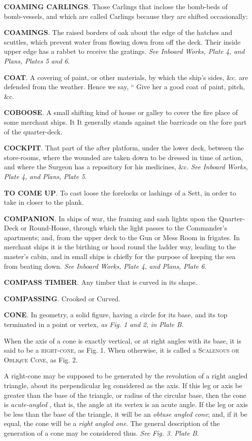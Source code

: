 \textbf{COAMING CARLINGS}. Those Carlings that inclose the bomb-beds of bomb-vessels, and which are called Carlings because they are shifted occasionally: 

\textbf{COAMINGS}. The raised borders of oak about the edge of the hatches and scuttles, which prevent water from flowing down from off the deck. Their inside upper edge has a rabbet to receive the gratings. \textit{See Inboard Works, Plate 4, and Plans, Plates 5 and 6}. 

\textbf{COAT}. A covering of paint, or other materials, by which the ship's sides, \&c. are defended from the weather. Hence we say, “ Give her a good coat of paint, pitch, \&c.

\textbf{COBOOSE}. A small shifting kind of house or galley to cover the fire place of some merchant ships. It It generally stands against the barricade on the fore part of the quarter-deck. 

\textbf{COCKPIT}. That part of the after platform, under the lower deck, between the store-rooms, where the wounded are taken down to be dressed in time of action, and where the Surgeon has a repository for his medicines, \&c. \textit{See Inboard Works, Plate 4, and Plans, Plate 5}. 

\textbf{TO COME UP}. To cast loose the forelocks or lashings of a Sett, in order to take in closer to the plank. 

\textbf{COMPANION}. In ships of war, the framing and sash lights upon the Quarter-Deck or Round-House, through which the light passes to the Commander's apartments; and, from the upper deck to the Gun or Mess Room in frigates. In merchant ships it is the birthing or hood round the ladder way, leading to the master's cabin, and in small ships is chiefly for the purpose of keeping the sea from beating down. \textit{See Inboard Works, Plate 4, and Plans, Plate 6}. 

\textbf{COMPASS TIMBER}. Any timber that is curved in its shape. 

\textbf{COMPASSING}. Crooked or Curved. 

\textbf{CONE}. In geometry, a solid figure, having a circle for its base, and its top terminated in a point or vertex, \textit{as Fig. 1 and 2, in Plate B}. 

When the axis of a cone is exactly vertical, or at right angles with its base, it is said to be a \textsc{right-cone}, as Fig. 1. When otherwise, it is called a \textsc{Scalenous or Oblique Cone}, as Fig. 2. 

A right-cone may be supposed to be generated by the revolution of a right angled triangle, about its perpendicular leg considered as the axis. If this leg or axis be greater than the base of the triangle, or radius of the circular base, then the cone is \textit{acute-angled} , that is, the angle at its vertex is an acute angle. If the leg or axis be less than the base of the triangle, it will be an \textit{obtuse angled cone}; and, if it be equal, the cone will be a \textit{right angled one}. The general description of the generation of a cone may be considered thus. \textit{See Fig. 3. Plate B}. 

